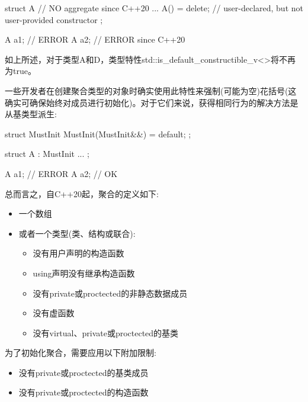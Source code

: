 \begin{cpp}
struct A { // NO aggregate since C++20
	...
	A() = delete; // user-declared, but not user-provided constructor
};

A a1; // ERROR
A a2{}; // ERROR since C++20
\end{cpp}

如上所述，对于类型A和D，类型特性std::is\_default\_constructible\_v<>将不再为true。

一些开发者在创建聚合类型的对象时确实使用此特性来强制(可能为空)花括号(这确实可确保始终对成员进行初始化)。对于它们来说，获得相同行为的解决方法是从基类型派生:

\begin{cpp}
struct MustInit {
	MustInit(MustInit&&) = default;
};

struct A : MustInit {
	...
};

A a1; // ERROR
A a2{}; // OK
\end{cpp}

总而言之，自C++20起，聚合的定义如下:

\begin{itemize}
\item
一个数组

\item
或者一个类型(类、结构或联合):

\begin{itemize}
\item
没有用户声明的构造函数

\item
using声明没有继承构造函数

\item
没有private或proctected的非静态数据成员

\item
没有虚函数

\item
没有virtual、private或proctected的基类
\end{itemize}

\end{itemize}

为了初始化聚合，需要应用以下附加限制:

\begin{itemize}
\item
没有private或proctected的基类成员

\item
没有private或proctected的构造函数
\end{itemize}











